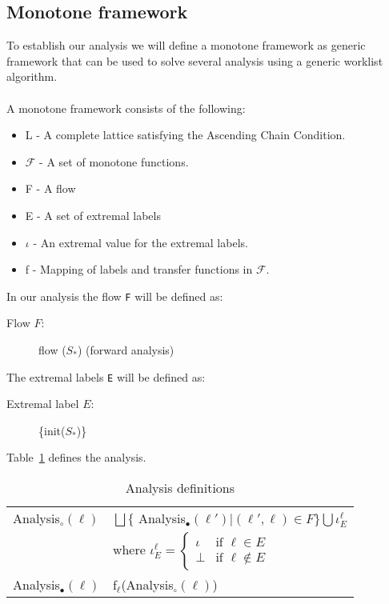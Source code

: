 \subsection{Monotone framework}
To establish our analysis we will define a monotone framework as generic framework that can be used to solve several analysis using a generic worklist algorithm.
\\\\
A monotone framework consists of the following:
\begin{itemize}
	\item L - A complete lattice satisfying the Ascending Chain Condition.
	\item $\mathcal{F}$ - A set of monotone functions.
	\item F - A flow
	\item E - A set of extremal labels
	\item $\iota$ - An extremal value for the extremal labels.
	\item f - Mapping of labels and transfer functions in $\mathcal{F}$.
\end{itemize}
In our analysis the flow \texttt{F} will be defined as:
\begin{description}
  \item[Flow $F$:] flow ($S_*$) (forward analysis)
\end{description}
The extremal labels \texttt{E} will be defined as:
\begin{description}
    \item[Extremal label $E$:] \{init($S_*$)\}
\end{description}
\noindent Table~\ref{table:signs_analysis_definition} defines the analysis.
\begin{table}
\begin{tabular}{| l | l |}
  \hline
  Analysis$_\circ(\ell)$ & $ \bigsqcup \{$ Analysis$_\bullet (\ell') | (\ell', \ell) \in F \} \bigcup \iota_E^{\ell} $ \\
                         & where $\iota_E^{\ell} = \begin{cases} \iota & \text{if } \ell \in E \\ 
                                                                 \bot  & \text{if } \ell \notin E
                                                   \end{cases}$\\
  \hline
  Analysis$_\bullet(\ell)$ & f$_\ell$(Analysis$_\circ(\ell)$)\\
  \hline
\end{tabular}
\centering
\caption{Analysis definitions}
\label{table:signs_analysis_definition}
\end{table}
